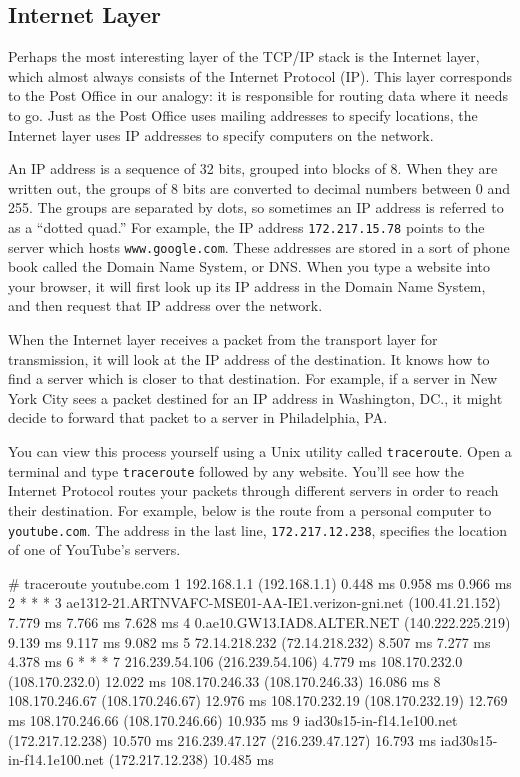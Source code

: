 \subsection{Internet Layer}

Perhaps the most interesting layer of the TCP/IP stack is the Internet layer, which almost always consists of the Internet Protocol (IP). This layer corresponds to the Post Office in our analogy: it is responsible for routing data where it needs to go. Just as the Post Office uses mailing addresses to specify locations, the Internet layer uses IP addresses to specify computers on the network.

An IP address is a sequence of 32 bits, grouped into blocks of 8. When they are written out, the groups of 8 bits are converted to decimal numbers between 0 and 255. The groups are separated by dots, so sometimes an IP address is referred to as a ``dotted quad.'' For example, the IP address \texttt{172.217.15.78} points to the server which hosts \texttt{www.google.com}. These addresses are stored in a sort of phone book called the Domain Name System, or DNS. When you type a website into your browser, it will first look up its IP address in the Domain Name System, and then request that IP address over the network.

When the Internet layer receives a packet from the transport layer for transmission, it will look at the IP address of the destination. It knows how to find a server which is closer to that destination. For example, if a server in New York City sees a packet destined for an IP address in Washington, DC., it might decide to forward that packet to a server in Philadelphia, PA.

You can view this process yourself using a Unix utility called \texttt{traceroute}. Open a terminal and type \texttt{traceroute} followed by any website. You'll see how the Internet Protocol routes your packets through different servers in order to reach their destination. For example, below is the route from a personal computer to \texttt{youtube.com}. The address in the last line, \texttt{172.217.12.238}, specifies the location of one of YouTube's servers.

\label{code:traceroute}
\begin{monospace}
# traceroute youtube.com
    1  192.168.1.1 (192.168.1.1)  0.448 ms  0.958 ms  0.966 ms
    2  * * *
    3  ae1312-21.ARTNVAFC-MSE01-AA-IE1.verizon-gni.net (100.41.21.152)  7.779 ms  7.766 ms  7.628 ms
    4  0.ae10.GW13.IAD8.ALTER.NET (140.222.225.219)  9.139 ms  9.117 ms  9.082 ms
    5  72.14.218.232 (72.14.218.232)  8.507 ms  7.277 ms  4.378 ms
    6  * * *
    7  216.239.54.106 (216.239.54.106)  4.779 ms 108.170.232.0 (108.170.232.0)  12.022 ms 108.170.246.33 (108.170.246.33)  16.086 ms
    8  108.170.246.67 (108.170.246.67)  12.976 ms 108.170.232.19 (108.170.232.19)  12.769 ms 108.170.246.66 (108.170.246.66)  10.935 ms
    9  iad30s15-in-f14.1e100.net (172.217.12.238)  10.570 ms 216.239.47.127 (216.239.47.127)  16.793 ms iad30s15-in-f14.1e100.net (172.217.12.238)  10.485 ms
\end{monospace}

